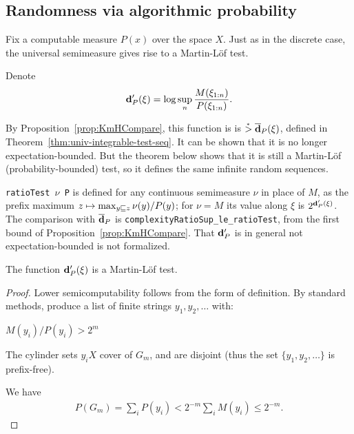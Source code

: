 \subsection{Randomness via algorithmic probability}

Fix a computable measure \( P(x) \) over the space \( X \).
Just as in the discrete case, the universal semimeasure gives rise to a
Martin-L\"of test.

\begin{definition}
  \label{def:g2.3.38}
  \leanok
Denote
 \begin{align*}
 \mathbf{d}'_{P}(\xi) = \log\sup_{n}\frac{M(\xi_{1:n})}{P(\xi_{1:n})}.
 \end{align*}
\end{definition}

By Proposition~\ref{prop:KmHCompare}, this function is
is \( \stackrel{{}_*}{>}\overline{\mathbf{d}}_{P}(\xi) \), defined in Theorem~\ref{thm:univ-integrable-test-seq}.
It can be shown that it is no longer expectation-bounded.
But the theorem below shows that it is still a Martin-L\"of
(probability-bounded) test, so it defines the same infinite random sequences.

\begin{formalization}
\texttt{ratioTest \( \nu \) P} is defined for any continuous semimeasure \( \nu \) in place of
\( M \), as the prefix maximum \( z \mapsto \max_{y \sqsubseteq z} \nu(y)/P(y) \); for
\( \nu = M \) its value along \( \xi \) is \( 2^{\mathbf{d}'_{P}(\xi)} \). The comparison with
\( \overline{\mathbf{d}}_{P} \) is \texttt{complexityRatioSup\_le\_ratioTest}, from the first bound of
Proposition~\ref{prop:KmHCompare}. That \( \mathbf{d}'_{P} \) is in general not expectation-bounded is
not formalized.
\end{formalization}

\begin{theorem}
  \label{thm:g2.3.7}
  \leanok
The function \( \mathbf{d}'_{P}(\xi) \) is a Martin-L\"of test.
\end{theorem}
\begin{proof}
  \leanok
Lower semicomputability follows from the form of definition.
By standard methods,
produce a list of finite strings \( y_{1},y_{2},\dots \) with:
\begin{alphenum}
\item \( M(y_{i})/P(y_{i})>2^{m} \)
\item The cylinder sets \( y_{i}X \) cover of \( G_{m} \), and are disjoint (thus the
  set \( \{y_{1},y_{2},\dots\} \) is prefix-free).
\end{alphenum}
We have
 \begin{align*}
   P(G_{m})=\sum_{i}P(y_{i})<2^{-m}\sum_{i}M(y_{i})\le 2^{-m}.
 \end{align*}
\end{proof}

